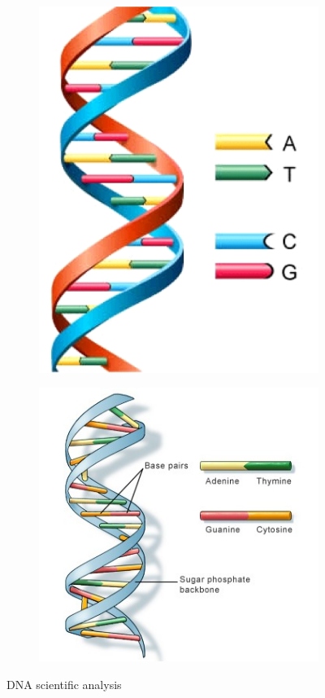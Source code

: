 \documentclass[12pt,openany]{llncs}
\begin{document}
\begin{figure}
	\begin{subfigure}{.5\textwidth}
		\includegraphics[width=.6\linewidth]{./figs/DNA-2}
	\end{subfigure}
	\begin{subfigure}{.5\textwidth}
		\includegraphics[width=.9\linewidth]{./figs/DNA-3}
	\end{subfigure}
	\caption{\label{fig:fig-DNA-2}DNA scientific analysis}
\end{figure}
\end{document}

